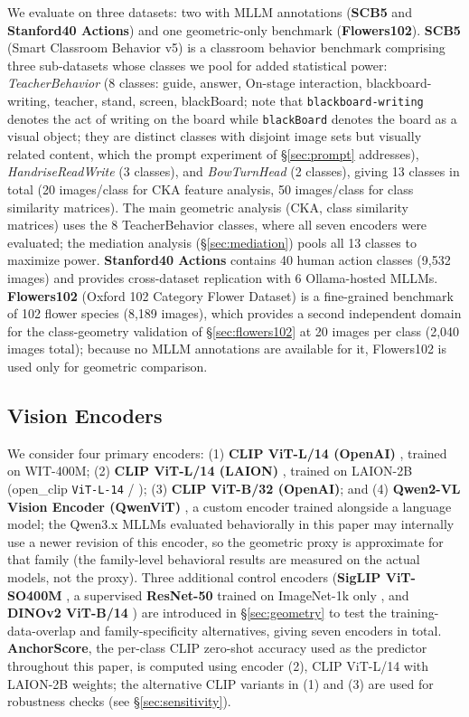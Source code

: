\documentclass[a4paper,fleqn]{cas-sc}
\begin{document}
We evaluate on three datasets: two with MLLM annotations (\textbf{SCB5} and \textbf{Stanford40 Actions}) and one geometric-only benchmark (\textbf{Flowers102}). \textbf{SCB5} (Smart Classroom Behavior v5) \cite{la} is a classroom behavior benchmark comprising three sub-datasets whose classes we pool for added statistical power: \emph{TeacherBehavior} (8 classes: guide, answer, On-stage interaction, blackboard-writing, teacher, stand, screen, blackBoard; note that \texttt{blackboard-writing} denotes the act of writing on the board while \texttt{blackBoard} denotes the board as a visual object; they are distinct classes with disjoint image sets but visually related content, which the prompt experiment of \S\ref{sec:prompt} addresses), \emph{HandriseReadWrite} (3 classes), and \emph{BowTurnHead} (2 classes), giving 13 classes in total (20 images/class for CKA feature analysis, 50 images/class for class similarity matrices). The main geometric analysis (CKA, class similarity matrices) uses the 8 TeacherBehavior classes, where all seven encoders were evaluated; the mediation analysis (\S\ref{sec:mediation}) pools all 13 classes to maximize power. \textbf{Stanford40 Actions} \cite{yao2011stanford40} contains 40 human action classes (9,532 images) and provides cross-dataset replication with 6 Ollama-hosted MLLMs. \textbf{Flowers102} (Oxford 102 Category Flower Dataset) \cite{nilsback2008flowers} is a fine-grained benchmark of 102 flower species (8,189 images), which provides a second independent domain for the class-geometry validation of \S\ref{sec:flowers102} at 20 images per class (2,040 images total); because no MLLM annotations are available for it, Flowers102 is used only for geometric comparison.

\subsection{Vision Encoders}

We consider four primary encoders: (1) \textbf{CLIP ViT-L/14 (OpenAI)} \cite{radford2021clip}, trained on WIT-400M; (2) \textbf{CLIP ViT-L/14 (LAION)} \cite{schuhmann2022laion5b}, trained on LAION-2B (open\_clip \texttt{ViT-L-14} /  \cite{cherti2023reproducible}); (3) \textbf{CLIP ViT-B/32 (OpenAI)}; and (4) \textbf{Qwen2-VL Vision Encoder (QwenViT)} \cite{wang2024qwen2vl}, a custom encoder trained alongside a language model; the Qwen3.x MLLMs evaluated behaviorally in this paper may internally use a newer revision of this encoder, so the geometric proxy is approximate for that family (the family-level behavioral results are measured on the actual models, not the proxy). Three additional control encoders (\textbf{SigLIP ViT-SO400M} \cite{zhai2023sigmoid}, a supervised \textbf{ResNet-50} trained on ImageNet-1k only \cite{he2016deep}, and \textbf{DINOv2 ViT-B/14} \cite{oquab2024dinov2}) are introduced in \S\ref{sec:geometry} to test the training-data-overlap and family-specificity alternatives, giving seven encoders in total. \textbf{AnchorScore}, the per-class CLIP zero-shot accuracy used as the predictor throughout this paper, is computed using encoder (2), CLIP ViT-L/14 with LAION-2B weights; the alternative CLIP variants in (1) and (3) are used for robustness checks (see \S\ref{sec:sensitivity}).
\end{document}
